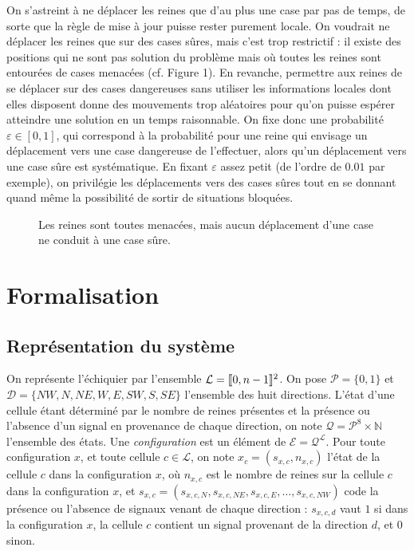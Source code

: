 \documentclass[11pt, openany]{article}
\newcommand{\cg }{[\kern-0.15em [}
\newcommand{\cd}{]\kern-0.15em]}
\newcommand{\N}{\mathbb{N}}
\newcommand{\La}{\mathcal{L}}
\newcommand{\D}{\mathcal{D}}
\newcommand{\E}{\mathcal{E}}
\begin{document}
On s'astreint à ne déplacer les reines que d'au plus une case par pas de temps, de sorte que la règle de mise à jour puisse rester purement locale. On voudrait ne déplacer les reines que sur des cases sûres, mais c'est trop restrictif : il existe des positions qui ne sont pas solution du problème mais où toutes les reines sont entourées de cases menacées (cf. Figure 1). En revanche, permettre aux reines de se déplacer sur des cases dangereuses sans utiliser les informations locales dont elles disposent donne des mouvements trop aléatoires pour qu'on puisse espérer atteindre une solution en un temps raisonnable. On fixe donc une probabilité $\varepsilon \in [0,1]$, qui correspond à la probabilité pour une reine qui envisage un déplacement vers une case dangereuse de l'effectuer, alors qu'un déplacement vers une case sûre est systématique. En fixant $\varepsilon$ assez petit (de l'ordre de $0.01$ par exemple), on privilégie les déplacements vers des cases sûres tout en se donnant quand même la possibilité de sortir de situations bloquées.


\begin{figure}
\centering

\newgame
{}
\notationoff
\showboard
\caption{Les reines sont toutes menacées, mais aucun déplacement d'une case ne conduit à une case sûre.}
\end{figure}

\section*{Formalisation}

\subsection*{Représentation du système}

\noindent
On représente l'échiquier par l'ensemble $\La = \cg 0, n-1\cd^2$. On pose $\mathcal{P} = \{0,1\}$ et $\D = \{NW,N,NE,W,E,SW,S,SE\}$ l'ensemble des huit directions. L'état d'une cellule étant déterminé par le nombre de reines présentes et la présence ou l'absence d'un signal en provenance de chaque direction, on note $\mathcal{Q} = {\mathcal{P}^8}\times\N$ l'ensemble des états. Une \emph{configuration} est un élément de $\E=\mathcal{Q}^\La$. Pour toute configuration $x$, et toute cellule $c \in \La$, on note $x_c = (s_{x, c}, n_{x, c})$ l'état de la cellule $c$ dans la configuration $x$, où $n_{x,c}$ est le nombre de reines sur la cellule $c$ dans la configuration $x$, et $s_{x,c} = (s_{x,c,N}, s_{x,c,NE}, s_{x,c,E}, \ldots, s_{x,c,NW})$ code la présence ou l'absence de signaux venant de chaque direction : $s_{x,c,d}$ vaut $1$ si dans la configuration $x$, la cellule $c$ contient un signal provenant de la direction $d$, et $0$ sinon.
\end{document}
